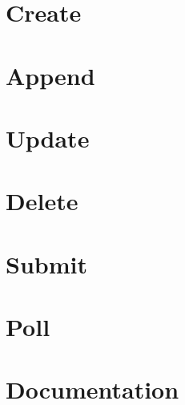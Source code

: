 \section{Create}

\section{Append}

\section{Update}

\section{Delete}

\section{Submit}

\section{Poll}

\section{Documentation}